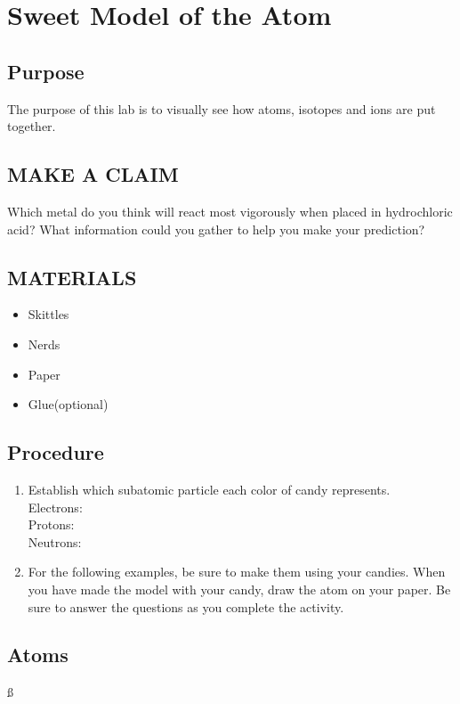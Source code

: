 \documentclass[a4paper,12pt]{exam}
\begin{document}
\section*{Sweet Model of the Atom}

\subsection*{Purpose}
The purpose of this lab is to visually see how atoms, isotopes and ions are put together.

\subsection*{MAKE A CLAIM}

Which metal do you think will react most vigorously when placed in
hydrochloric acid? What information could you gather to help you make
your prediction?


 \subsection*{MATERIALS}

 \begin{itemize}
    \item Skittles
    \item Nerds
    \item Paper
    \item Glue(optional)
\end{itemize}

 \subsection*{Procedure}

 \begin{enumerate}

    \item Establish which subatomic particle each color of candy represents.\\
        Electrons:\\
        Protons:\\
        Neutrons:
    \item For the following examples, be sure to make them using your candies. When you have made the model with your candy, draw the atom on your paper.
    Be sure to answer the questions as you complete the activity.

\end{enumerate}




\subsection*{Atoms}

\begin{questions}
    
\question {}
\vspace{8cm}
ß
\question {}
\vspace{8cm}


\question {}
\vspace{8cm}

\question {}
\vspace{8cm}


\end{questions}
\end{document}
